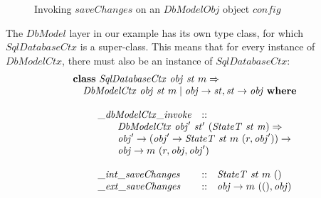 \begin{figure}
    \begin{center}
    \end{center}
    \caption{Invoking $\mathit{saveChanges}$ on an $\mathit{DbModelObj}$ object $\mathit{config}$} \label{fig:invoke}
\end{figure}

The $\mathit{DbModel}$ layer in our example has its own type class, for which $\mathit{SqlDatabaseCtx}$ is a super-class. This means that for every instance of $\mathit{DbModelCtx}$, there must also be an instance of $\mathit{SqlDatabaseCtx}$:
\begin{displaymath}
\begin{array}{l}
\mathbf{class}~\mathit{SqlDatabaseCtx}~\mathit{obj}~\mathit{st}~m \Rightarrow \\
\quad \mathit{DbModelCtx}~\mathit{obj}~\mathit{st}~m \mid \mathit{obj} \to \mathit{st}, \mathit{st} \to \mathit{obj}~\mathbf{where}\\\\
\qquad \begin{array}{lcl}
\mathit{\_\mathit{dbModelCtx\_invoke}} & :: & \\
\multicolumn{3}{l}{\qquad \mathit{DbModelCtx}~\mathit{obj}'~\mathit{st}'~(\mathit{StateT}~\mathit{st}~\mathit{m}) \Rightarrow}\\
\multicolumn{3}{l}{\qquad \mathit{obj}' \to (\mathit{obj}' \to \mathit{StateT}~\mathit{st}~m~(r,\mathit{obj}')) \to} \\
\multicolumn{3}{l}{\qquad \mathit{obj} \to m~(r,\mathit{obj},\mathit{obj}')} \\\\
\mathit{\_int\_saveChanges} & :: & \mathit{StateT}~\mathit{st}~m~\mathit{()} \\
\mathit{\_ext\_saveChanges} & :: & \mathit{obj} \to m~(\mathit{()}, \mathit{obj})
\end{array}
\end{array}
\end{displaymath}

